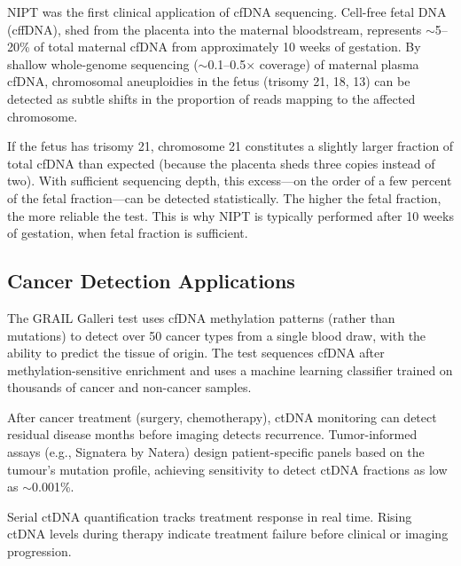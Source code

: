 NIPT was the first clinical application of cfDNA sequencing. Cell-free fetal DNA (cffDNA), shed from the placenta into the maternal bloodstream, represents $\sim$5--20\% of total maternal cfDNA from approximately 10 weeks of gestation. By shallow whole-genome sequencing ($\sim$0.1--0.5$\times$ coverage) of maternal plasma cfDNA, chromosomal aneuploidies in the fetus (trisomy 21, 18, 13) can be detected as subtle shifts in the proportion of reads mapping to the affected chromosome.

\begin{keyconcept}[title={NIPT Statistical Principle}]
If the fetus has trisomy 21, chromosome 21 constitutes a slightly larger fraction of total cfDNA than expected (because the placenta sheds three copies instead of two). With sufficient sequencing depth, this excess---on the order of a few percent of the fetal fraction---can be detected statistically. The higher the fetal fraction, the more reliable the test. This is why NIPT is typically performed after 10 weeks of gestation, when fetal fraction is sufficient.
\end{keyconcept}

\subsection{Cancer Detection Applications}
\label{subsec:specialized:cancer-detection}

\begin{description}[style=nextline, itemsep=3pt]
  \item[Multi-cancer early detection (MCED)] The GRAIL Galleri test uses cfDNA methylation patterns (rather than mutations) to detect over 50 cancer types from a single blood draw, with the ability to predict the tissue of origin. The test sequences cfDNA after methylation-sensitive enrichment and uses a machine learning classifier trained on thousands of cancer and non-cancer samples.

  \item[Minimal residual disease (MRD)] After cancer treatment (surgery, chemotherapy), ctDNA monitoring can detect residual disease months before imaging detects recurrence. Tumor-informed assays (e.g., Signatera by Natera) design patient-specific panels based on the tumour's mutation profile, achieving sensitivity to detect ctDNA fractions as low as $\sim$0.001\%.

  \item[Treatment monitoring] Serial ctDNA quantification tracks treatment response in real time. Rising ctDNA levels during therapy indicate treatment failure before clinical or imaging progression.
\end{description}

